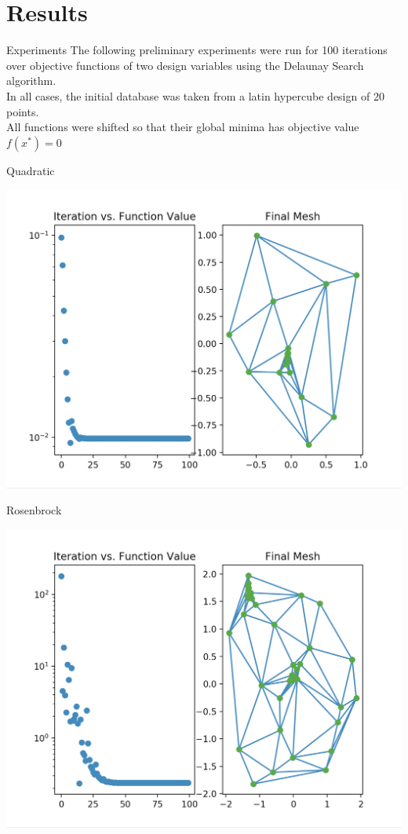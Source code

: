 \documentclass[xcolor=dvipsnames]{beamer}
\begin{document}
\section{Results}
\begin{frame}{Experiments}
The following preliminary experiments were run for 100 iterations over
objective functions of two design variables using the Delaunay Search
algorithm.\\
\medskip
In all cases, the initial database was taken from a latin hypercube design
of 20 points.\\
\medskip
All functions were shifted so that their global minima has objective
value $f(x^*) = 0$\\
\end{frame}
\begin{frame}{Quadratic}
\begin{center}
\includegraphics[width=0.8\columnwidth]{QuadraticError.png}
\end{center}
\end{frame}
\begin{frame}{Rosenbrock}
\begin{center}
\includegraphics[width=0.8\columnwidth]{RosenbrockError.png}
\end{center}
\end{frame}
\end{document}
